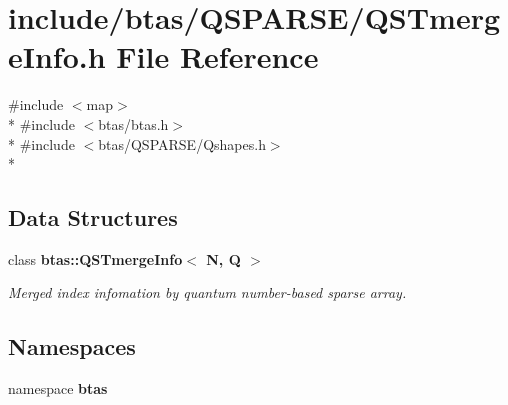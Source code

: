 \section{include/btas/\-Q\-S\-P\-A\-R\-S\-E/\-Q\-S\-Tmerge\-Info.h File Reference}
\label{d5/d49/QSTmergeInfo_8h}
{\ttfamily \#include $<$map$>$}\\*
{\ttfamily \#include $<$btas/btas.\-h$>$}\\*
{\ttfamily \#include $<$btas/\-Q\-S\-P\-A\-R\-S\-E/\-Qshapes.\-h$>$}\\*
\subsection*{Data Structures}
\begin{DoxyCompactItemize}
\item 
class {\bf btas\-::\-Q\-S\-Tmerge\-Info$<$ N, Q $>$}
\begin{DoxyCompactList}\small\item\em Merged index infomation by quantum number-\/based sparse array. \end{DoxyCompactList}\end{DoxyCompactItemize}
\subsection*{Namespaces}
\begin{DoxyCompactItemize}
\item 
namespace {\bf btas}
\end{DoxyCompactItemize}
